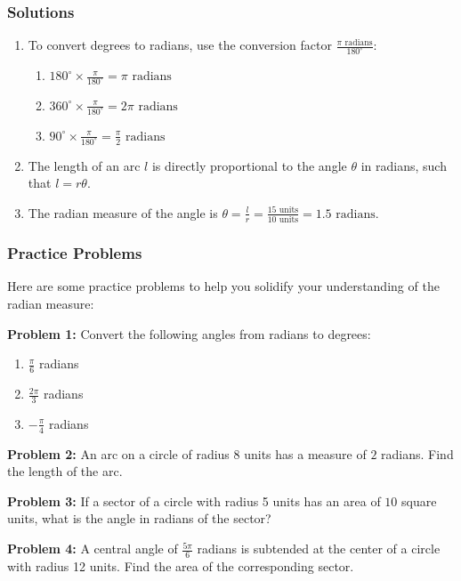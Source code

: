 \documentclass[a4paper,12pt]{book}
\begin{document}
\subsubsection*{Solutions}
\begin{enumerate}
  \item To convert degrees to radians, use the conversion factor \( \frac{\pi \text{ radians}}{180^\circ} \):
    \begin{enumerate}[label=\alph*.]
      \item \( 180^\circ \times \frac{\pi}{180^\circ} = \pi \text{ radians} \)
      \item \( 360^\circ \times \frac{\pi}{180^\circ} = 2\pi \text{ radians} \)
      \item \( 90^\circ \times \frac{\pi}{180^\circ} = \frac{\pi}{2} \text{ radians} \)
    \end{enumerate}
  \item The length of an arc \( l \) is directly proportional to the angle \( \theta \) in radians, such that \( l = r\theta \).
  \item The radian measure of the angle is \( \theta = \frac{l}{r} = \frac{15 \text{ units}}{10 \text{ units}} = 1.5 \text{ radians} \).
\end{enumerate}

\subsubsection*{Practice Problems}
Here are some practice problems to help you solidify your understanding of the radian measure:

\textbf{Problem 1:} Convert the following angles from radians to degrees:
\begin{enumerate}[label=\alph*.]
  \item \( \frac{\pi}{6} \) radians
  \item \( \frac{2\pi}{3} \) radians
  \item \( -\frac{\pi}{4} \) radians
\end{enumerate}

\textbf{Problem 2:} An arc on a circle of radius 8 units has a measure of \( 2 \) radians. Find the length of the arc.

\textbf{Problem 3:} If a sector of a circle with radius 5 units has an area of \( 10 \) square units, what is the angle in radians of the sector?

\textbf{Problem 4:} A central angle of \( \frac{5\pi}{6} \) radians is subtended at the center of a circle with radius 12 units. Find the area of the corresponding sector.
\end{document}
